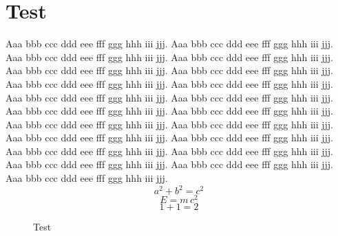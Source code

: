 \documentclass{article}
\begin{document}
\section{Test}
\label{sec:test}

Aaa bbb ccc ddd eee fff ggg hhh iii jjj. Aaa bbb ccc ddd eee fff ggg hhh iii
jjj. Aaa bbb ccc ddd eee fff ggg hhh iii jjj. Aaa bbb ccc ddd eee fff ggg hhh
iii jjj. Aaa bbb ccc ddd eee fff ggg hhh iii jjj. Aaa bbb ccc ddd eee fff ggg
hhh iii jjj. Aaa bbb ccc ddd eee fff ggg hhh iii jjj. Aaa bbb ccc ddd eee fff
ggg hhh iii jjj. Aaa bbb ccc ddd eee fff ggg hhh iii jjj. Aaa bbb ccc ddd eee
fff ggg hhh iii jjj. Aaa bbb ccc ddd eee fff ggg hhh iii jjj. Aaa bbb ccc ddd
eee fff ggg hhh iii jjj. Aaa bbb ccc ddd eee fff ggg hhh iii jjj. Aaa bbb ccc
ddd eee fff ggg hhh iii jjj. Aaa bbb ccc ddd eee fff ggg hhh iii jjj. Aaa bbb
ccc ddd eee fff ggg hhh iii jjj. Aaa bbb ccc ddd eee fff ggg hhh iii jjj. Aaa
bbb ccc ddd eee fff ggg hhh iii jjj. Aaa bbb ccc ddd eee fff ggg hhh iii jjj.
Aaa bbb ccc ddd eee fff ggg hhh iii jjj. Aaa bbb ccc ddd eee fff ggg hhh iii
jjj.
%
    \begin{equation}
    \label{eq:a}
        a^2 + b^2 = c^2
    \end{equation}
%
    \begin{equation}
    \label{eq:b}
        E = m \, c^2
    \end{equation}
%
    \begin{equation}
    \label{eq:c}
        1 + 1 = 2
    \end{equation}

\newpage

\begin{figure}
        \centering
    \caption{Test}
        \label{fig:test}
\end{figure}
\end{document}
